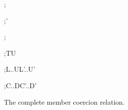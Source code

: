 \documentclass[acmsmall,screen,nonacm]{acmart}
\begin{document}
\begin{figure}[H]
\ContinuedFloat
{}
  {\Omega;\sigma\vdash\mu\coerce\nu}
\noindent
\begin{minipage}[t]{0.31\linewidth}

  {\Omega;\sigma\vdash\mu\coerce\mu'}
\end{minipage}\hfill
\begin{minipage}[t]{0.31\linewidth}
  {\Omega;\sigma\vdash\mu\coerce\nu}

  {\Omega;\sigma\vdash T\coerce U}
\end{minipage}\hfill
\begin{minipage}[t]{0.34\linewidth}
  {\Omega;\sigma\vdash L..U\coerce L'..U'}

  {\Omega;\sigma\vdash C..D\coerce C'..D'}
\end{minipage}

\caption{The complete member coercion relation.}
\label{fig:member-coercions}
\end{figure}
\end{document}
